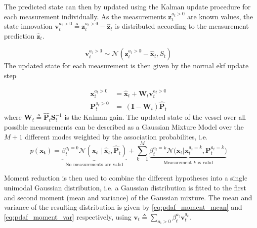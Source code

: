 The predicted state can then by updated using the Kalman update procedure for each measurement individually. As the measurements $\boldsymbol{z}_t^{a_t > 0}$ are known values, the state innovation $\boldsymbol{v}_t^{a_t>0} \triangleq \boldsymbol{z}_t^{a_t>0} - \hat{\boldsymbol{z}}_t$ is distributed according to the measurement prediction $\hat{\boldsymbol{z}}_t$.

\begin{equation}
    \boldsymbol{v}_t^{a_t>0} \sim \mathcal{N}(\boldsymbol{z}_t^{a_t>0} - \hat{\boldsymbol{x}}_t, S_t)
\end{equation}
The updated state for each measurement is then given by the normal \acrshort{ekf} update step

\begin{subequations}
    \begin{align}
        \boldsymbol{x}_t^{a_t > 0} & = \hat{\boldsymbol{x}}_t + \boldsymbol{W}_t \boldsymbol{v}_t^{a_t > 0} \\
        \boldsymbol{P}_t^{a_t > 0} & = \ (\boldsymbol{I} - \boldsymbol{W}_t) \hat{\boldsymbol{P}}_t
    \end{align}
\end{subequations}
where $\boldsymbol{W}_t \triangleq \hat{\boldsymbol{P}}_t \boldsymbol{S}_t^{-1}$ is the Kalman gain.
The updated state of the vessel over all possible measurements can be described as a Gaussian Mixture Model over the $M+1$ different modes weighted by the association probabilites, i.e.
\begin{equation}
    p(\boldsymbol{x_t}) = \underbrace{\beta_t^{a_t=0} \mathcal{N}(\boldsymbol{x}_t \; | \; \hat{\boldsymbol{x}}_t, \hat{\boldsymbol{P}}_t)}_{\text{No measurements are valid}} + \sum_{k=1}^M \underbrace{\beta_t^{a_t=k} \mathcal{N}\big(\boldsymbol{x}_t | \boldsymbol{x}_t^{a_t=k}, \boldsymbol{P}_t^{a_t=k}\big)}_{\text{Measurement $k$ is valid}}
\end{equation}


Moment reduction is then used to combine the different hypotheses into a single unimodal Gaussian distribution, i.e. a Gaussian distribution is fitted to the first and second moment (mean and variance) of the Gaussian mixture. The mean and variance of the resulting distribution is given by \cref{eq:pdaf_moment_mean} and \cref{eq:pdaf_moment_var} respectively, using $\boldsymbol{v}_t \triangleq \sum_{a_t > 0} \beta_t^{a_t} \boldsymbol{v}_t^{a_t}$.

